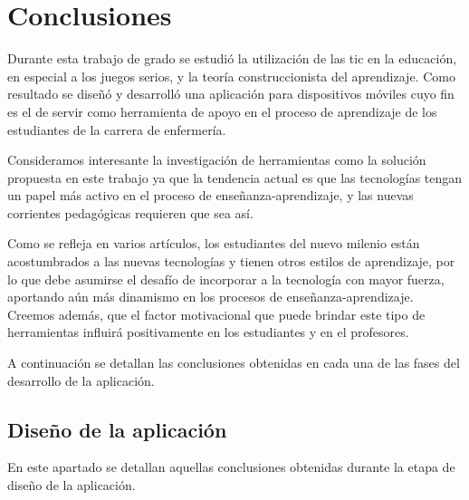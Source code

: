 \section{Conclusiones}

Durante esta trabajo de grado se estudió la utilización de las \Gls{tic} en la
educación, en especial a los juegos serios, y la teoría construccionista del
aprendizaje. Como resultado se diseñó y desarrolló una aplicación para
dispositivos móviles cuyo fin es el de servir como herramienta de apoyo en el
proceso de aprendizaje de los estudiantes de la carrera de enfermería.

Consideramos interesante la investigación de herramientas como la solución
propuesta en este trabajo ya que la tendencia actual es que las tecnologías
tengan un papel más activo en el proceso de enseñanza-aprendizaje, y las nuevas
corrientes pedagógicas requieren que sea así. 

Como se refleja en varios artículos, los estudiantes del nuevo milenio están
acostumbrados a las nuevas tecnologías y tienen otros estilos de aprendizaje,
por lo que debe asumirse el desafío de incorporar a la tecnología con mayor
fuerza, aportando aún más dinamismo en los procesos de enseñanza-aprendizaje.
Creemos además, que el factor motivacional que puede brindar este tipo de
herramientas influirá positivamente en los estudiantes y en el profesores.

A continuación se detallan las conclusiones obtenidas en cada una de las fases 
del desarrollo de la aplicación.

\subsection{Diseño de la aplicación}

En este apartado se detallan aquellas conclusiones obtenidas durante la 
etapa de diseño de la aplicación.

